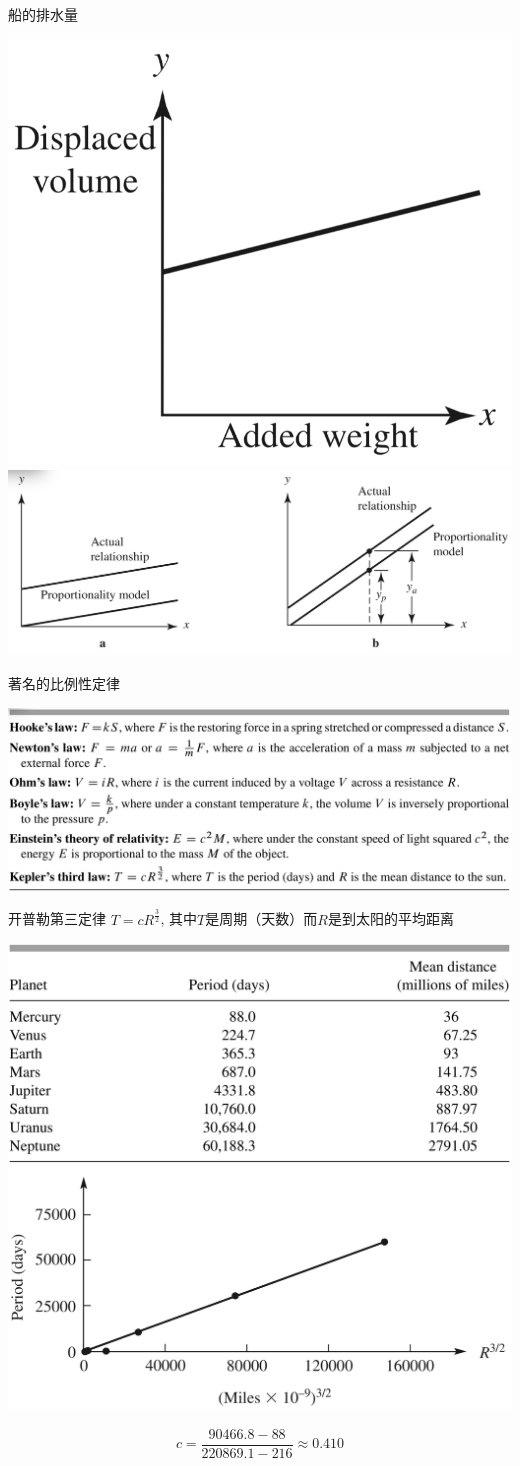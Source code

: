 \documentclass[UTF8]{ctexbeamer}
\begin{document}
\begin{frame}{船的排水量}
  \begin{center}
    \includegraphics[width=.3\textwidth{}]{boatwater.png}
    \includegraphics[width=.6\textwidth{}]{propapprox.png}
  \end{center}
\end{frame}

\begin{frame}{著名的比例性定律}
  \begin{center}
    \includegraphics[width=.8\textwidth{}]{proptheory.png}
  \end{center}
\end{frame}

\begin{frame}{开普勒第三定律}
  $T=cR^{\frac{3}{2}}$, 其中$T$是周期（天数）而$R$是到太阳的平均距离

  \begin{center}
    \includegraphics[width=.45\textwidth{}]{keplertable.png}
    \includegraphics[width=.45\textwidth{}]{keplerfig.png}
  \end{center}

  \[
  c = \frac{90466.8-88}{220869.1-216} \approx 0.410
  \]
  
\end{frame}
\end{document}
